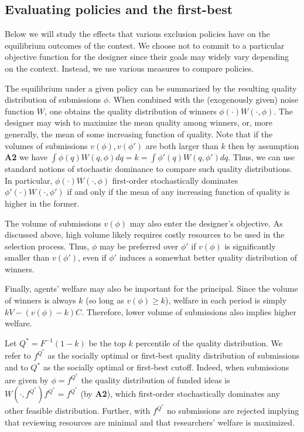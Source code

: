 \documentclass[12pt]{article}
\theoremstyle{plain}
\theoremstyle{definition}
\theoremstyle{remark}
\begin{document}
\subsection{Evaluating policies and the first-best}\label{subsec-evaluating}

Below we will study the effects that various exclusion policies have on the equilibrium outcomes of the contest. We choose not to commit to a particular objective function for the designer since their goals may widely vary depending on the context. Instead, we use various measures to compare policies.  

The equilibrium under a given policy can be summarized by the resulting quality distribution of submissions $\phi$. When combined with the (exogenously given) noise function $W$, one obtains the quality distribution of winners $\phi(\cdot)W(\cdot,\phi)$. The designer may wish to maximize the mean quality among winners, or, more generally, the mean of some increasing function of quality. Note that if the volumes of submissions $v(\phi), v(\phi')$ are both larger than $k$ then by assumption \textbf{A2} we have $\int \phi(q)W(q,\phi)dq = k =\int \phi'(q)W(q,\phi')dq$. Thus, we can use standard notions of stochastic dominance to compare such quality distributions. In particular, $\phi(\cdot)W(\cdot,\phi)$ first-order stochastically dominates $\phi'(\cdot)W(\cdot,\phi')$ if and only if the mean of any increasing function of quality is higher in the former.%

The volume of submissions $v(\phi)$ may also enter the designer's objective. As discussed above, high volume likely requires costly resources to be used in the selection process. Thus, $\phi$ may be preferred over $\phi'$ if $v(\phi)$ is significantly smaller than $v(\phi')$, even if $\phi'$ induces a somewhat better quality distribution of winners.

Finally, agents' welfare may also be important for the principal. Since the volume of winners is always $k$ (so long as $v(\phi)\ge k$), welfare in each period is simply $kV-(v(\phi)-k)C$. Therefore, lower volume of submissions also implies higher welfare.

Let $Q^*=F^{-1}(1-k)$ be the top $k$ percentile of the quality distribution. We refer to $f^{Q^*}$ as the socially optimal or first-best quality distribution of submissions and to $Q^*$ as the socially optimal or first-best cutoff. Indeed, when submissions are given by $\phi=f^{Q^*}$ the quality distribution of funded ideas is $W(\cdot,f^{Q^*})f^{Q^*} = f^{Q^*}$ (by \textbf{A2}), which first-order stochastically dominates any other feasible distribution. Further, with $f^{Q^*}$ no submissions are rejected implying that reviewing resources are minimal and that researchers' welfare is maximized. 
\end{document}
